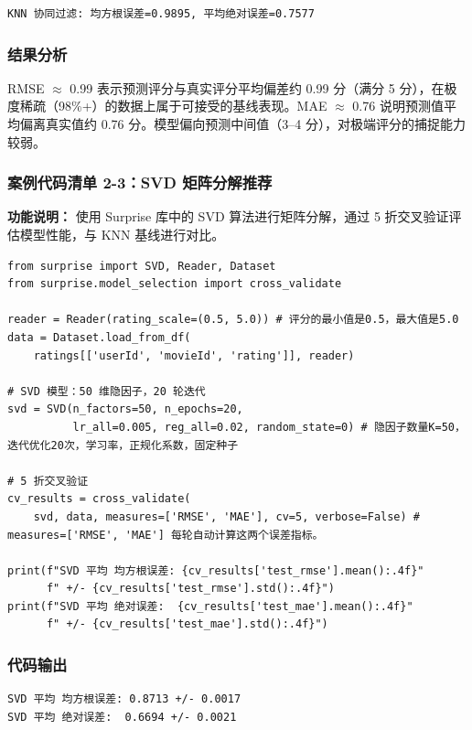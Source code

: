 \documentclass[12pt,a4paper]{ctexart}
\begin{document}
{\footnotesize
\begin{verbatim}
KNN 协同过滤: 均方根误差=0.9895, 平均绝对误差=0.7577
\end{verbatim}
}

\subsubsection{结果分析}

RMSE $\approx$ 0.99 表示预测评分与真实评分平均偏差约 0.99 分（满分 5 分），在极度稀疏（98\%+）的数据上属于可接受的基线表现。MAE $\approx$ 0.76 说明预测值平均偏离真实值约 0.76 分。模型偏向预测中间值（3--4 分），对极端评分的捕捉能力较弱。

\subsubsection{案例代码清单 2-3：SVD 矩阵分解推荐}

\textbf{功能说明：} 使用 Surprise 库中的 SVD 算法进行矩阵分解，通过 5 折交叉验证评估模型性能，与 KNN 基线进行对比。

\begin{lstlisting}[caption={SVD 矩阵分解与交叉验证}, label={lst:2-3}]
from surprise import SVD, Reader, Dataset
from surprise.model_selection import cross_validate

reader = Reader(rating_scale=(0.5, 5.0)) # 评分的最小值是0.5，最大值是5.0
data = Dataset.load_from_df(
    ratings[['userId', 'movieId', 'rating']], reader)

# SVD 模型：50 维隐因子，20 轮迭代
svd = SVD(n_factors=50, n_epochs=20,
          lr_all=0.005, reg_all=0.02, random_state=0) # 隐因子数量K=50，迭代优化20次，学习率，正规化系数，固定种子

# 5 折交叉验证
cv_results = cross_validate(
    svd, data, measures=['RMSE', 'MAE'], cv=5, verbose=False) # measures=['RMSE', 'MAE'] 每轮自动计算这两个误差指标。

print(f"SVD 平均 均方根误差: {cv_results['test_rmse'].mean():.4f}"
      f" +/- {cv_results['test_rmse'].std():.4f}")
print(f"SVD 平均 绝对误差:  {cv_results['test_mae'].mean():.4f}"
      f" +/- {cv_results['test_mae'].std():.4f}")
\end{lstlisting}

\subsubsection{代码输出}

{\footnotesize
\begin{verbatim}
SVD 平均 均方根误差: 0.8713 +/- 0.0017
SVD 平均 绝对误差:  0.6694 +/- 0.0021
\end{verbatim}
}
\end{document}
